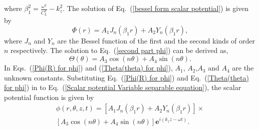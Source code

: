\documentclass[10pt]{asme2ej}
\begin{document}
where $\beta_1^{2} = \frac{\omega^{2}}{C_{L}^{2}} - k_z^{2}$. The solution of Eq.~(\ref{bessel form scalar potential}) is given by
\begin{equation}\label{Phi(R) for phi}
    \Phi(r) = A_{1}J_{n}(\beta_1 r) + A_{2}Y_{n}(\beta_1 r), 
\end{equation}
where $J_{n}$ and $Y_{n}$ are the Bessel function of the first and the second kinds of order $n$ respectively. The solution to Eq.~(\ref{second part phi}) can be derived as,
\begin{equation}\label{Theta(theta) for phi}
    \Theta(\theta) = A_{3}\cos(n\theta) + A_{4}\sin(n\theta).
\end{equation}
In Eqs.~(\ref{Phi(R) for phi}) and (\ref{Theta(theta) for phi}), $A_1$, $A_2$,$A_3$ and $A_4$ are the unknown constants. Substituting Eq.~(\ref{Phi(R) for phi}) and Eq.~(\ref{Theta(theta) for phi}) in to Eq.~(\ref{Scalar potential Variable separable equation}), the scalar potential function is given by
\begin{multline}\label{scalar potential function 1}
    \phi(r,\theta,z,t) = \left[A_{1}J_{n}(\beta_1 r) + A_{2}Y_{n}(\beta_1 r)\right]\times\\ \left[A_{3}\cos(n\theta) + A_{4}\sin(n\theta)\right]\mathbf{e}^{i(k_{z}z-\omega t)}.
\end{multline}
\end{document}
